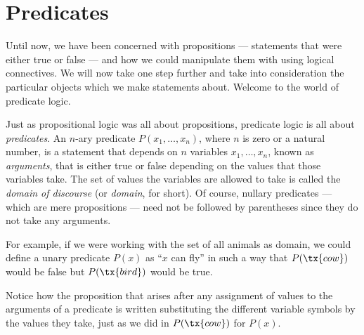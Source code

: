 
\section{Predicates}

\begin{para}
Until now, we have been concerned with propositions --- statements that were either true or false --- and how we could manipulate them with using logical connectives.
We will now take one step further and take into consideration the particular objects which we make statements about.
Welcome to the world of predicate logic.
\end{para}

\begin{para}[Predicates]
Just as propositional logic was all about propositions, predicate logic is all about \emph{predicates}.
An $n$-ary predicate $P(x_1,\ldots,x_n)$, where $n$ is zero or a natural number, is a statement that depends on $n$ variables $x_1,\ldots,x_n$, known as \emph{arguments}, that is either true or false depending on the values that those variables take.
The set of values the variables are allowed to take is called the \emph{domain of discourse} (or \emph{domain}, for short).
Of course, nullary predicates --- which are mere propositions --- need not be followed by parentheses since they do not take any arguments.

For example, if we were working with the set of all animals as domain, we could define a unary predicate $P(x)$ as ``$x$ can fly'' in such a way that $P(\tx{cow})$ would be false but $P(\tx{bird})$ would be true.

Notice how the proposition that arises after any assignment of values to the arguments of a predicate is written substituting the different variable symbols by the values they take, just as we did in $P(\tx{cow})$ for $P(x)$.


\end{para}

